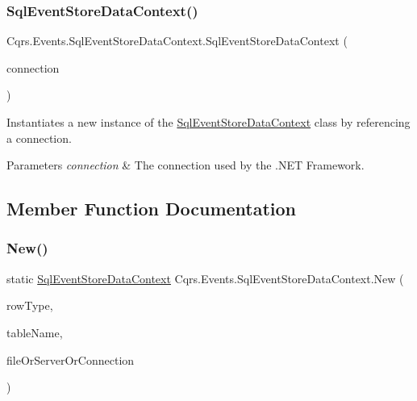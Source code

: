 \subsubsection{\texorpdfstring{Sql\+Event\+Store\+Data\+Context()}{SqlEventStoreDataContext()}\hspace{0.1cm}{\footnotesize\ttfamily [2/2]}}
{\footnotesize\ttfamily Cqrs.\+Events.\+Sql\+Event\+Store\+Data\+Context.\+Sql\+Event\+Store\+Data\+Context (\begin{DoxyParamCaption}\item[{System.\+Data.\+I\+Db\+Connection}]{connection }\end{DoxyParamCaption})}



Instantiates a new instance of the \hyperlink{classCqrs_1_1Events_1_1SqlEventStoreDataContext}{Sql\+Event\+Store\+Data\+Context} class by referencing a connection. 


\begin{DoxyParams}{Parameters}
{\em connection} & The connection used by the .N\+ET Framework.\\
\hline
\end{DoxyParams}


\subsection{Member Function Documentation}
\mbox{\label{classCqrs_1_1Events_1_1SqlEventStoreDataContext_ae059fb99b1100d4d7fb917b635c1be5d_ae059fb99b1100d4d7fb917b635c1be5d}} 
\subsubsection{\texorpdfstring{New()}{New()}\hspace{0.1cm}{\footnotesize\ttfamily [1/2]}}
{\footnotesize\ttfamily static \hyperlink{classCqrs_1_1Events_1_1SqlEventStoreDataContext}{Sql\+Event\+Store\+Data\+Context} Cqrs.\+Events.\+Sql\+Event\+Store\+Data\+Context.\+New (\begin{DoxyParamCaption}\item[{Type}]{row\+Type,  }\item[{string}]{table\+Name,  }\item[{string}]{file\+Or\+Server\+Or\+Connection }\end{DoxyParamCaption})\hspace{0.3cm}{\ttfamily [static]}}



